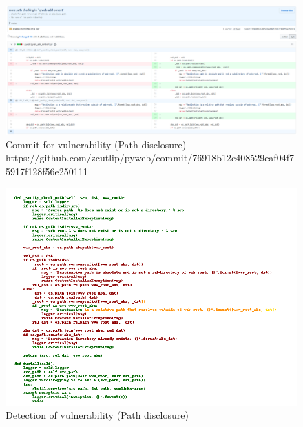 \documentclass[
a4paper,
pagesize,
pdftex,
12pt,
twoside, %
BCOR=5mm, %
ngerman,
fleqn,
final,
]{scrartcl}
\begin{document}
	\begin{figure}[H]
		\centering
		\includegraphics[width=\linewidth]{Images/path_disclosureC}
		\caption{Commit for vulnerability (Path disclosure) \newline \scriptsize{https://github.com/zcutlip/pyweb/commit/76918b12c408529eaf04f75917f128f56e250111}}
		\label{fig:path_disclosureB}
	\end{figure}
	\begin{figure}[H]
		\centering
		\includegraphics[width=\linewidth]{Images/path_disclosureCr}
		\caption{Detection of vulnerability (Path disclosure)}
		\label{fig:path_disclosureBr}
	\end{figure}
	
\end{document}
